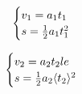 \begin{equation} \begin{cases}v_{1}=a_1 t_{1}\\ s=\frac{1}{2}a_{1} t_{1}^{2}\\ \end{cases}\ \\  \end{equation}

\begin{equation} \begin{cases}v_{2}=a_2 t_{2}le\\ s=\frac{1}{2}a_{2}\langle t_{2}\rangle^{2}\\ \end{cases}\ \\  \end{equation}